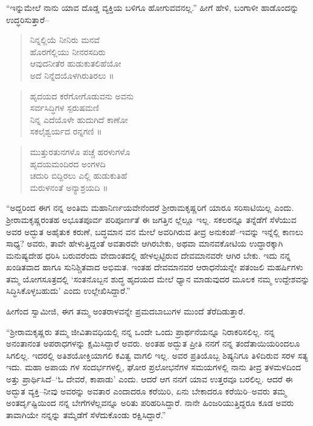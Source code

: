 “ಇನ್ನುಮೇಲೆ ನಾನು ಯಾವ ದೊಡ್ಡ ವ್ಯಕ್ತಿಯ ಬಳಿಗೂ ಹೋಗುವವನಲ್ಲ.” ಹೀಗೆ ಹೇಳಿ, ಬಂಗಾಳೀ ಹಾಡೊಂದನ್ನು ಉದ್ಧರಿಸುತ್ತಾರೆ–

\begin{verse}
ನಿನ್ನಲ್ಲಿಯೆ ನೀನಿರು ಮನವೆ\\ಹೊರಗೆಲ್ಲಿಯು ನೀನರಸದಿರು\\ಆವುದನೀತೆರ ಹುಡುಕುತಲಿಹೆಯೋ\\ಅದೆ ನಿನ್ನೆದಯೊಳಗಿರುತಿರಲು ॥
\end{verse}

\begin{verse}
ಹೃದಯದ ಕರೆಗೋಗೊಡುವನು ಅವನು\\ಸರ್ವಸಿದ್ಧಿಗಳ ಸ್ಪರುಷಮಣಿ\\ನಿನ್ನ ಎದೆಯೊಳೇ ಹುದುಗಿದೆ ಕಾಣೋ\\ಸಕಲೈಶ್ವರ್ಯದ ರನ್ನಗಣಿ ॥
\end{verse}

\begin{verse}
ಮುತ್ತುರತುನಗಳೊ ಪಚ್ಚೆ ಹರಳುಗಳೊ\\ಹೃದಯಮಂದಿರದ ಅಂಗಳದಿ\\ಚದುರಿ ಬಿದ್ದಿರಲು ಎಲ್ಲಿ ಹುಡುಕುತಿಹೆ\\ಮರುಳನಂತೆ ಅನ್ಯಾಶ್ರಯದಿ ॥
\end{verse}

“ಅದ್ದರಿಂದ ಈಗ ನನ್ನ ಅಂತಿಮ ಮಹಾನಿರ್ಣಯವೇನೆಂದರೆ ಶ್ರೀರಾಮಕೃಷ್ಣರಿಗೆ ಯಾರೂ ಸರಿಸಾಟಿಯಿಲ್ಲ ಎಂದು. ಶ್ರೀರಾಮಕೃಷ್ಣರಂತಹ ಅಭೂತಪೂರ್ವ ಪರಿಪೂರ್ಣತೆ ಈ ಜಗತ್ತಿನ ಲ್ಲೆಲ್ಲೂ ಇಲ್ಲ. ಸಕಲರನ್ನೂ ತನ್ನೆಡೆಗೆ ಸೆಳೆಯುವ ಅವರ ಅದ್ಭುತ ಅಹೈತುಕ ಕರುಣೆ, ಬದ್ಧಮಾನ ವನ ಮೇಲೆ ಅವರಿಗಿರುವ ತೀವ್ರ ಅನುಕಂಪೆ–ಇವನ್ನು ಇನ್ನೆಲ್ಲಿ ಕಾಣಲು ಸಾಧ್ಯ? ಅವರು, ತಾವೇ ಹೇಳುತ್ತಿದ್ದಂತೆ ಅವತಾರವೇ ಆಗಿರಬೇಕು, ಅಥವಾ ಮಾನವಕೋಟಿಯ ಉದ್ಧಾರಕ್ಕಾಗಿ ಮನುಷ್ಯದೇಹ ಧರಿಸಿ ಬರುವರೆಂದು ವೇದಾಂತದಲ್ಲಿ ಹೇಳಲ್ಪಟ್ಟಿರುವ ದೇವಮಾನವರೇ ಆಗಿರ ಬೇಕು. ಇದು ನನ್ನ ಖಂಡಿತವಾದ ಹಾಗೂ ಸುನಿಶ್ಚಿತವಾದ ಅಭಿಮತ. ಇಂತಹ ದೇವಮಾನವರ ಆರಾಧನೆಯನ್ನೇ ಪತಂಜಲಿ ಮಹರ್ಷಿಗಳು ತಮ್ಮ ಯೋಗಸೂತ್ರದಲ್ಲಿ ‘ಸಂತನೊಬ್ಬನ ಶುದ್ಧ ಹೃದಯದ ಮೇಲೆ ಧ್ಯಾನ ಮಾಡುವುದರ ಮೂಲಕ ನಮ್ಮ ಉದ್ದೇಶವನ್ನು ಸಿದ್ಧಿಸಿಕೊಳ್ಳಬಹುದು’ ಎಂದು ಉಲ್ಲೇಖಿಸಿದ್ದಾರೆ.”

ಹೀಗೆಂದ ಸ್ವಾಮೀಜಿ, ಈಗ ತಮ್ಮ ಅಂತರಾಳವನ್ನೇ ಪ್ರಮದಬಾಬುಗಳ ಮುಂದೆ ತೆರೆದಿಡುತ್ತಾರೆ.

“ಶ್ರೀರಾಮಕೃಷ್ಣರು ತಮ್ಮ ಜೀವಿತಾವಧಿಯಲ್ಲಿ ನನ್ನ ಒಂದೇ ಒಂದು ಪ್ರಾರ್ಥನೆಯನ್ನೂ ನಿರಾಕರಿಸಲಿಲ್ಲ. ನನ್ನ ಅನಂತಾನಂತ ಅಪರಾಧಗಳನ್ನು ಕ್ಷಮಿಸಿದ್ದಾರೆ ಅವರು. ಅಂತಹ ಅದ್ಭುತ ಪ್ರೀತಿ ನನಗೆ ನನ್ನ ತಂದೆತಾಯಿಯರಿಂದಲೂ ಸಿಗಲಿಲ್ಲ. ಇದರಲ್ಲಿ ಅತಿಶಯೋಕ್ತಿಯಾಗಲಿ ಕವಿತ್ವ ವಾಗಲಿ ಇಲ್ಲ. ಅವರ ಪ್ರತಿಯೊಬ್ಬ ಶಿಷ್ಯನಿಗೂ ತಿಳಿದಿರುವ ಸರಳ ಸತ್ಯ ಇದು. ಮಹಾ ಅಪಾಯ ಗಳ ಸಂದರ್ಭಗಳಲ್ಲಿ, ಘೋರ ಪ್ರಲೋಭನೆಗಳ ಸಮಯಗಳಲ್ಲಿ ನಾನು ತೀವ್ರ ತಳಮಳದಿಂದ ಅತ್ತು ಪ್ರಾರ್ಥಿಸಿದೆ–‘ಓ ದೇವರೆ, ಕಾಪಾಡು’ ಎಂದು. ಆದರೆ ಆಗ ನನಗೆ ಯಾವ ಉತ್ತರವೂ ಬರಲಿಲ್ಲ. ಆದರೆ ಈ ಅದ್ಭುತ ವ್ಯಕ್ತಿ–ನೀವು ಅವರನ್ನು ಅವತಾರ ಎಂದಾದರೂ ಕರೆಯಿರಿ, ಏನು ಬೇಕಾದರೂ ಕರೆಯಿರಿ–ಅವರು ತಮ್ಮ ಅಂತರ್ದೃಷ್ಟಿಯಿಂದ ನನ್ನ ಬೇಗೆಗಳೆಲ್ಲವನ್ನೂ ಅರಿತು ಪರಿಹರಿಸಿದ್ದಾರೆ. ನಾನೇ ಹಿಂಜರಿಯುತ್ತಿದ್ದರೂ ಕೂಡ ಅವರು ತಾವಾಗಿಯೇ ನನ್ನನ್ನು ತಮ್ಮೆಡೆಗೆ ಸೆಳೆದುಕೊಂಡು ರಕ್ಷಿಸಿದ್ದಾರೆ.”

